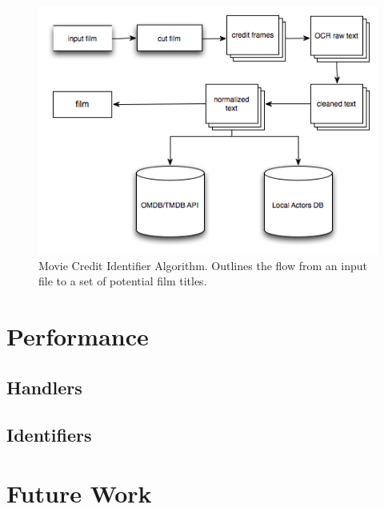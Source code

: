 \documentclass[paper=a4, fontsize=11pt]{scrartcl} %
\numberwithin{equation}{section} %
\numberwithin{figure}{section} %
\numberwithin{table}{section} %
\begin{document}
\begin{figure}[H]
\center\includegraphics[scale=0.80]{credit-identifier.png}
\caption{Movie Credit Identifier Algorithm. Outlines the flow from an input file to a set of potential film titles.}
\label{fig:credit-identifier}
\end{figure}


\section{Performance}
\label{sec:performance}


\subsection{Handlers}
\label{sec:handlers}

\subsection{Identifiers}
\label{sec:identifiers}



\section{Future Work}
\label{sec:future-work}
\end{document}
